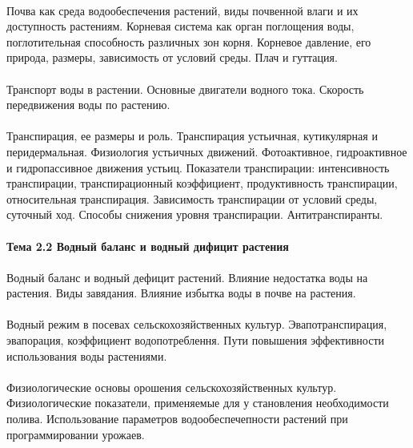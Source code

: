\paragraph*{}Почва как среда водообеспечения растений, виды почвенной влаги и их доступность растениям. Корневая система как орган поглощения воды, поглотительная способность различных зон корня. Корневое давление, его природа, размеры, зависимость от условий среды. Плач и гуттация.

\paragraph*{}Транспорт воды в растении. Основные двигатели водного тока. Скорость передвижения воды по растению.

\paragraph*{}Транспирация, ее размеры и роль. Транспирация устьичная, кутикулярная и перидермальная. Физиология устьичных движений. Фотоактивное, гидроактивное и гидропассивное движения устьиц. Показатели транспирации: интенсивность транспирации, транспирационный коэффициент, продуктивность транспирации, относительная транспирация. Зависимость транспирации от условий среды, суточный ход. Способы снижения уровня транспирации. Антитранспиранты.

\paragraph*{Тема 2.2 Водный баланс и водный дифицит растения}

\paragraph*{}Водный баланс и водный дефицит растений. Влияние недостатка воды на растения. Виды завядания. Влияние избытка воды в почве на растения.

\paragraph*{}Водный режим в посевах сельскохозяйственных культур. Эвапотранспирация, эвапорация, коэффициент водопотреблення. Пути повышения эффективности использования воды растениями.

\paragraph*{}Физиологические основы орошения сельскохозяйственных культур. Физиологические показатели, применяемые для у становления необходимости полива. Использование параметров водообеспечепности растений при программировании урожаев.

